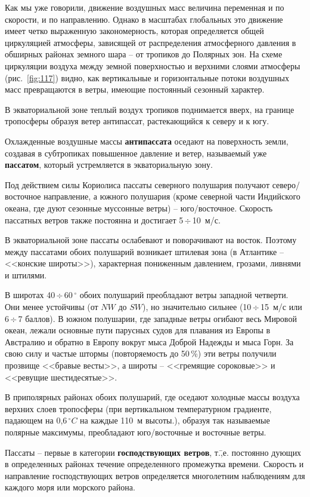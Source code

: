 \documentclass[a4paper, 12pt, twoside, final, book, russian, fittopage, cyremdash]{ncc}
\newcommand{\gr}{\ensuremath{\,^\circ}\xspace}
\newcommand{\grC}{\ensuremath{\,^{\circ}C}\xspace}
\newcommand{\otdo}{\,\ensuremath{\div}\,}
\newcommand{\ris}[1]{\ref{fig:#1}}
\begin{document}
Как мы уже говорили, движение воздушных масс величина переменная и по скорости, и по направлению. Однако в масштабах глобальных это движение имеет четко выраженную закономерность, которая определяется общей циркуляцией атмосферы, зависящей от распределения атмосферного давления в обширных районах земного шара \--- от тропиков до Полярных зон. На схеме циркуляции воздуха между земной поверхностью и верхними слоями атмосферы (рис.~\ris{117}) видно, как вертикальные и горизонтальные потоки воздушных масс превращаются в ветры, имеющие постоянный сезонный характер.

В экваториальной зоне теплый воздух тропиков поднимается вверх, на границе тропосферы образуя ветер антипассат, растекающийся к северу и к югу.

Охлажденные воздушные массы \textbf{антипассата} оседают на поверхность земли, создавая в субтропиках повышенное давление и ветер, называемый уже \textbf{пассатом}, который устремляется в экваториальную зону.

Под действием силы Кориолиса пассаты северного полушария получают северо\-/восточное направление, а южного полушария (кроме северной части Индийского океана, где дуют сезонные муссонные ветры) \--- юго\-/восточное. Скорость пассатных ветров также постоянна и достигает 5\otdo 10~м/с.

В экваториальной зоне пассаты ослабевают и поворачивают на восток. Поэтому между пассатами обоих полушарий возникает штилевая зона (в Атлантике \--- <<конские широты>>), характерная пониженным давлением, грозами, ливнями и штилями.

В широтах 40\otdo 60\gr обоих полушарий преобладают ветры западной четверти. Они менее устойчивы (от $NW$ до $SW$), но значительно сильнее (10\otdo 15~м/с или 6\otdo 7 баллов). В южном полушарии, где западные ветры огибают весь Мировой океан, лежали основные пути парусных судов для плавания из Европы в Австралию и обратно в Европу вокруг мыса Доброй Надежды и мыса Горн. За свою силу и частые штормы (повторяемость до 50\,\%) эти ветры получили прозвище <<бравые весты>>, а широты \--- <<гремящие сороковые>> и <<ревущие шестидесятые>>.

В приполярных районах обоих полушарий, где оседают холодные массы воздуха верхних слоев тропосферы (при вертикальном температурном градиенте, падающем на 0,6\grC на каждые 110~м высоты.), образуя так называемые полярные максимумы, преобладают юго\-/восточные и восточные ветры.

Пассаты \--- первые в категории \textbf{господствующих ветров}, т.\=,е. постоянно дующих в определенных районах течение определенного промежутка времени. Скорость и направление господствующих ветров определяется многолетним наблюдениям для каждого моря или морского района.
\end{document}
